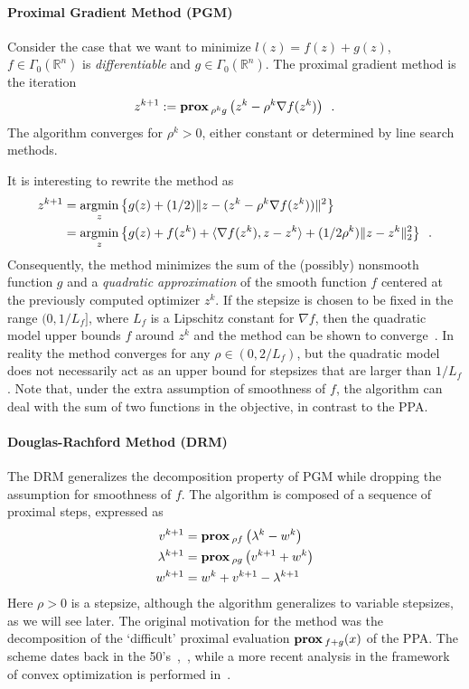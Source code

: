 \documentclass[openany]{now}
\newcommand{\reals}{{\mathbb R}}
\newcommand{\argmin}{\mathop{\rm argmin}}
\newcommand{\prox}{\mathop{\bf prox}}
\begin{document}
\paragraph{Proximal Gradient Method (PGM)} Consider the case that we want to minimize $l(z) = f(z)+g(z)$, $f\in\Gamma_0(\reals^n)$ is \emph{differentiable} and $g\in\Gamma_0(\reals^n)$. The proximal gradient method is the iteration
\begin{equation}{\label{ch2::eq:PGM}}
 z^{k+1} :=  \prox{_{\rho^kg}}\left(z^k-\rho^k\nabla f(z^k)\right)\enspace.
\end{equation}
The algorithm converges for $\rho^k>0$, either constant or determined by line search methods.

It is interesting to rewrite the method as
\begin{align*}
 z^{k+1} &=  \argmin_z\left\{g(z)+(1/2)\|z-(z^k-\rho^k\nabla f(z^k))\|^2\right\}\\
         &=  \argmin_z\left\{g(z)+f(z^k)+\langle\nabla f(z^k),z-z^k\rangle+(1/2\rho^k)\|z-z^k\|^2_2\right\}\enspace.
\end{align*}
Consequently, the method minimizes the sum of the (possibly) nonsmooth function $g$ and a \emph{quadratic approximation} of the smooth function $f$ centered at the previously computed optimizer $z^k$. If the stepsize is chosen to be fixed in the range $(0,1/L_f]$, where $L_f$ is a Lipschitz constant for $\nabla f$, then the quadratic model upper bounds $f$ around $z^k$ and the method can be shown to converge~\cite{fista}. In reality the method converges for any $\rho\in(0,2/L_f)$, but the quadratic model does not necessarily act as an upper bound for stepsizes that are larger than $1/L_f$. Note that, under the extra assumption of smoothness of $f$, the algorithm can deal with the sum of two functions in the objective, in contrast to the PPA.

\paragraph{Douglas-Rachford Method (DRM)} The DRM generalizes the decomposition property of PGM while dropping the assumption for smoothness of $f$. The algorithm is composed of a sequence of proximal steps, expressed as
\begin{align}{\label{ch2::eq:DRM}}
 v^{k+1}             \nonumber&=  \prox{_{\rho f}}\left(\lambda^k-w^k\right)\\
 \lambda^{k+1}       \nonumber&=  \prox{_{\rho g}}\left(v^{k+1}+w^k\right)\\
 w^{k+1}                      &=  w^k+v^{k+1}-\lambda^{k+1}
\end{align}
Here $\rho>0$ is a stepsize, although the algorithm generalizes to variable stepsizes, as we will see later. The original motivation for the method was the decomposition of the `difficult' proximal evaluation $\prox{_{f+g}}(x)$ of the PPA. The scheme dates back in the 50's~\cite{GloMar},~\cite{GaMe}, while a more recent analysis in the framework of convex optimization is performed in~\cite{Eckstein_dr}.
\end{document}
